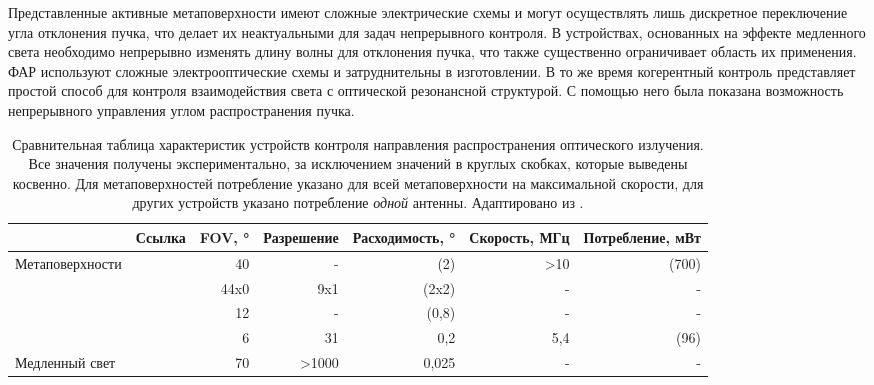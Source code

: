 Представленные активные метаповерхности имеют сложные электрические схемы и могут осуществлять лишь дискретное переключение угла отклонения пучка, что делает их неактуальными для задач непрерывного контроля. В устройствах, основанных на эффекте медленного света необходимо непрерывно изменять длину волны для отклонения пучка, что также существенно ограничивает область их применения. ФАР используют сложные электрооптические схемы и затруднительны в изготовлении. В то же время когерентный контроль представляет простой способ для контроля взаимодействия света с оптической резонансной структурой. С помощью него была показана возможность непрерывного управления углом распространения пучка.
\begin{table}[h]
    \caption{Сравнительная таблица характеристик устройств контроля направления распространения оптического излучения. Все значения получены экспериментально, за исключением значений в круглых скобках, которые выведены косвенно. Для метаповерхностей потребление указано для всей метаповерхности на максимальной скорости, для других устройств указано потребление \textit{одной} антенны. Адаптировано из \cite{lin_high-performance_2022}.}
    \scriptsize{
        \begin{tabular}[width=\textwidth]{|l|r|r|r|r|r|r|}
            \hline
                                                                      & Ссылка                       & FOV, ° & Разрешение & Расходимость, ° & Скорость, МГц & Потребление, мВт \\
            \hline
            \multirow{4}{*}{\parbox{53pt}{Ме\-та\-по\-вер\-хно\-сти}} & \cite{huang2016gate}         & 40     & -          & (2)             & >10           & (700)            \\
                                                                      & \cite{sokhoyan2020electro}   & 44x0   & 9x1        & (2x2)           & -             & -                \\
                                                                      & \cite{wu2019dynamic}         & 12     & -          & (0,8)           & -             & -                \\
                                                                      & \cite{park2021all}           & 6      & 31         & 0,2             & 5,4           & (96)             \\
            \hline
            \multirow{4}{*}{\parbox{53pt}{Мед\-лен\-ный свет}}        & \cite{gu2011giant}           & 70     & >1000      & 0,025           & -             & -                \\

\end{tabular}}
\end{table}
